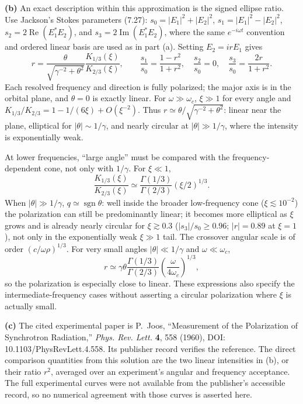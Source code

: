 \textbf{(b)} An exact description within this approximation is the
signed ellipse ratio. Use Jackson's Stokes parameters (7.27):
$s_0=|E_1|^2+|E_2|^2$, $s_1=|E_1|^2-|E_2|^2$,
$s_2=2\operatorname{Re}(E_1^*E_2)$, and
$s_3=2\operatorname{Im}(E_1^*E_2)$, where the same
$e^{-i\omega t}$ convention and ordered linear basis are used as in
part (a). Setting $E_2=irE_1$ gives
\[
r=\frac\theta{\sqrt{\gamma^{-2}+\theta^2}}
\frac{K_{1/3}(\xi)}{K_{2/3}(\xi)},\qquad
\frac{s_1}{s_0}=\frac{1-r^2}{1+r^2},\quad
\frac{s_2}{s_0}=0,\quad \frac{s_3}{s_0}=\frac{2r}{1+r^2}.
\]
Each resolved frequency and direction is fully polarized; the major
axis is in the orbital plane, and $\theta=0$ is exactly linear.
For $\omega\gg\omega_c$, $\xi\gg1$ for every angle and
$K_{1/3}/K_{2/3}=1-1/(6\xi)+O(\xi^{-2})$.
Thus $r\simeq\theta/\sqrt{\gamma^{-2}+\theta^2}$:
linear near the plane, elliptical for $|\theta|\sim1/\gamma$, and
nearly circular at $|\theta|\gg1/\gamma$, where the intensity is
exponentially weak.

At lower frequencies, ``large angle'' must be compared with the
frequency-dependent cone, not only with $1/\gamma$.
For $\xi\ll1$,
\[
\frac{K_{1/3}(\xi)}{K_{2/3}(\xi)}
\simeq\frac{\Gamma(1/3)}{\Gamma(2/3)}(\xi/2)^{1/3}.
\]
When $|\theta|\gg1/\gamma$, $q\simeq\operatorname{sgn}\theta$:
well inside the broader low-frequency cone ($\xi\lesssim10^{-2}$) the
polarization can still be predominantly linear; it becomes more
elliptical as $\xi$ grows and is already nearly circular for
$\xi\gtrsim0.3$ ($|s_3|/s_0\ge0.96$; $|r|=0.89$ at $\xi=1$), not only in
the exponentially weak $\xi\gg1$ tail.
The crossover angular scale is of order $(c/\omega\rho)^{1/3}$.
For very small angles $|\theta|\ll1/\gamma$ and $\omega\ll\omega_c$,
\[
r\simeq\gamma\theta\frac{\Gamma(1/3)}{\Gamma(2/3)}
\left(\frac\omega{4\omega_c}\right)^{1/3},
\]
so the polarization is especially close to linear. These expressions
also specify the intermediate-frequency cases without asserting a
circular polarization where $\xi$ is actually small.

\textbf{(c)} The cited experimental paper is P.~Joos,
``Measurement of the Polarization of Synchrotron Radiation,''
\emph{Phys. Rev. Lett.} \textbf{4}, 558 (1960),
DOI: 10.1103/PhysRevLett.4.558. Its publisher record verifies the reference.
The direct comparison quantities from this solution are the two linear
intensities in (b), or their ratio $r^2$, averaged over an experiment's
angular and frequency acceptance. The full experimental curves were
not available from the publisher's accessible record, so no numerical
agreement with those curves is asserted here.

